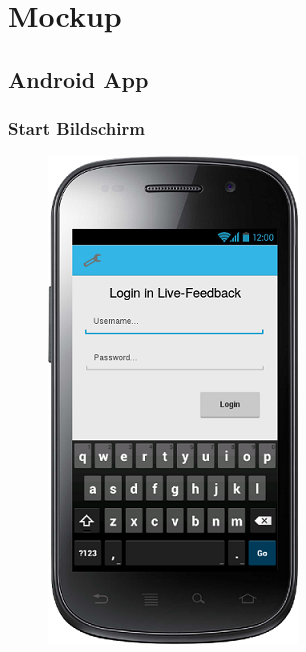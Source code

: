 \documentclass[german,a4paper]{beamer}
\begin{document}
\section{Mockup}
\subsection{Android App}
\begin{frame}
\frametitle{Start Bildschirm}
\begin{figure}
  \centering
  \includegraphics[height=0.75\textheight]{./mockups/mockup_login.png}
\end{figure}
\end{frame}
\end{document}
